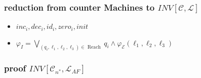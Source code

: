 \begin{frame}
    \frametitle{reduction from counter Machines to $INV[\mathcal{C},\mathcal{L}]$}
    \begin{itemize}
        \item $inc_i, dec_i, id_i, zero_i, init$
        \item $\varphi_{I}=\bigvee_{\left(q_{i}, \ell_{1}, \ell_{2}, \ell_{3}\right) \in \text { Reach }} q_{i} \wedge \varphi_{\mathcal{E}}\left(\ell_{1}, \ell_{2}, \ell_{3}\right) $
    \end{itemize}
\end{frame}
\begin{frame}
    \frametitle{proof $INV\left[\mathcal{C}_{n^{*}}, \mathcal{L}_{A F}\right]$}
    \begin{itemize}
        
    \end{itemize}
\end{frame}
